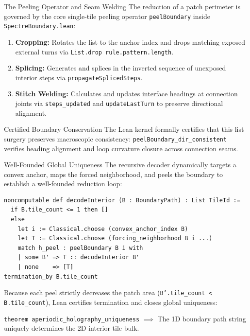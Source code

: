 \documentclass[10pt]{beamer}
\begin{document}
\begin{frame}{The Peeling Operator and Seam Welding}
The reduction of a patch perimeter is governed by the core single-tile peeling operator \texttt{peelBoundary} inside \texttt{SpectreBoundary.lean}:
\vfill
\begin{enumerate}
    \item \textbf{Cropping:} Rotates the list to the anchor index and drops matching exposed external turns via \texttt{List.drop rule.pattern.length}.
    \item \textbf{Splicing:} Generates and splices in the inverted sequence of unexposed interior steps via \texttt{propagateSplicedSteps}.
    \item \textbf{Stitch Welding:} Calculates and updates interface headings at connection joints via \texttt{steps\_updated} and \texttt{updateLastTurn} to preserve directional alignment.
\end{enumerate}
\vfill
\begin{block}{Certified Boundary Conservation}
The Lean kernel formally certifies that this list surgery preserves macroscopic consistency: \texttt{peelBoundary\_dir\_consistent} verifies heading alignment and loop curvature closure across connection seams.
\end{block}
\end{frame}

\begin{frame}[fragile]{Well-Founded Global Uniqueness}
The recursive decoder dynamically targets a convex anchor, maps the forced neighborhood, and peels the boundary to establish a well-founded reduction loop:
\vfill
\begin{lstlisting}[language=Lean4]
noncomputable def decodeInterior (B : BoundaryPath) : List TileId :=
  if B.tile_count <= 1 then []
  else
    let i := Classical.choose (convex_anchor_index B)
    let T := Classical.choose (forcing_neighborhood B i ...)
    match h_peel : peelBoundary B i with
    | some B' => T :: decodeInterior B'
    | none    => [T]
termination_by B.tile_count
\end{lstlisting}
\vfill
Because each peel strictly decreases the patch area (\texttt{B'.tile\_count < B.tile\_count}), Lean certifies termination and closes global uniqueness:
\begin{center}
\texttt{theorem aperiodic\_holography\_uniqueness} $\implies$ The 1D boundary path string uniquely determines the 2D interior tile bulk.
\end{center}
\end{frame}
\end{document}
